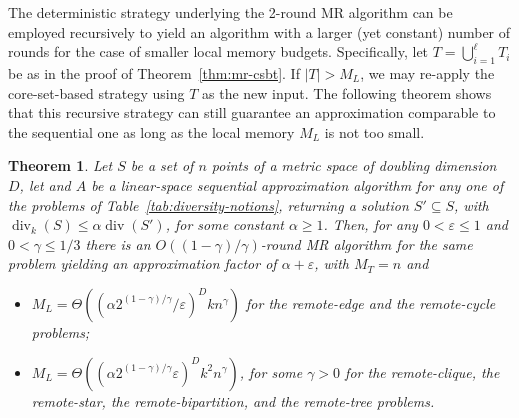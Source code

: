 \documentclass{article}
\newtheorem{theorem}{Theorem}
\DeclareMathOperator{\diversity}{div}
\renewcommand{\epsilon}{\varepsilon}
\newcommand{\BO}[1]{O\left( #1 \right)}
\newcommand{\BT}[1]{\Theta\left( #1 \right)}
\begin{document}
The deterministic strategy underlying the 2-round MR algorithm can be
employed recursively to yield an algorithm with a larger (yet
constant) number of rounds for the case of smaller local memory
budgets. Specifically, let $T = \bigcup_{i=1}^{\ell}T_i$ be as in the
proof of Theorem~\ref{thm:mr-csbt}.  If $|T|>M_L$, we may re-apply the
core-set-based strategy using $T$ as the new input.  The following
theorem shows that this recursive
strategy can still guarantee an approximation comparable to the
sequential one as long as the local memory $M_L$ is not too small.
\begin{theorem} \label{thm-multi-rounds} Let $S$ be a set of $n$
  points of a metric space of doubling dimension $D$, let and $A$ be a
  linear-space sequential approximation algorithm for any one of the
  problems of Table~\ref{tab:diversity-notions}, returning a solution
  $S'\subseteq S$, with $\diversity_k(S)\leq \alpha\diversity(S')$,
  for some constant $\alpha \geq 1$.  Then, for any
  $0<\epsilon \leq 1$ and $0 < \gamma \leq 1/3$ there is an
  $\BO{(1-\gamma)/\gamma}$-round MR algorithm for the same problem
  yielding an approximation factor of $\alpha+\epsilon$, with $M_T=n$
  and
  \begin{itemize}
  \item $M_L=\BT{(\alpha 2^{(1-\gamma)/\gamma}/\epsilon)^Dkn^\gamma}$ for the remote-edge
    and the remote-cycle problems;
  \item $M_L=\BT{(\alpha 2^{(1-\gamma)/\gamma} \epsilon)^Dk^2n^\gamma}$, for some $\gamma>0$ for the remote-clique,
    the remote-star, the remote-bipartition, and the remote-tree
    problems.
  \end{itemize}
\end{theorem}
\end{document}
